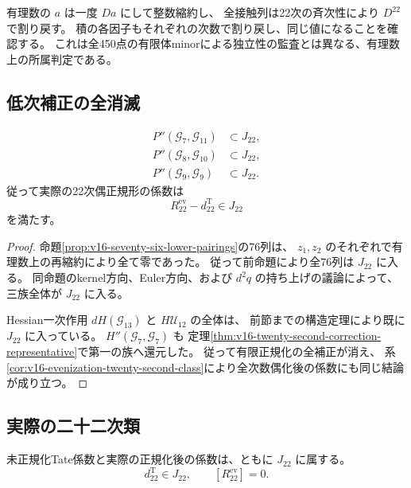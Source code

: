 有理数の $a$ は一度 $Da$ にして整数縮約し、
全接触列は22次の斉次性により $D^{22}$ で割り戻す。
積の各因子もそれぞれの次数で割り戻し、同じ値になることを確認する。
これは全450点の有限体minorによる独立性の監査とは異なる、有理数上の所属判定である。

\subsection{低次補正の全消滅}

\begin{corollary}[二十二次の全低次正規化補正は通常像に入る]
\label{cor:v16-all-lower-corrections-in-image}
\[
 \begin{split}
 P''(\mathcal G_7,\mathcal G_{11})&\subset J_{22},\\
 P''(\mathcal G_8,\mathcal G_{10})&\subset J_{22},\\
 P''(\mathcal G_9,\mathcal G_9)&\subset J_{22}.
 \end{split}
\]
従って実際の22次偶正規形の係数は
\begin{equation}\label{eq:v16-all-corrections-vanish}
 R_{22}^{\mathrm{ev}}-d_{22}^{\mathrm T}\in J_{22}
\end{equation}
を満たす。
\end{corollary}

\begin{proof}
命題\ref{prop:v16-seventy-six-lower-pairings}の76列は、
$z_1,z_2$ のそれぞれで有理数上の再縮約により全て零であった。
従って前命題により全76列は $J_{22}$ に入る。
同命題のkernel方向、Euler方向、および $d^2q$ の持ち上げの議論によって、
三族全体が $J_{22}$ に入る。

Hessian一次作用 $dH(\mathcal G_{13})$ と $H\mathcal U_{12}$ の全体は、
前節までの構造定理により既に $J_{22}$ に入っている。
$H''(\mathcal G_7,\mathcal G_7)$ も
定理\ref{thm:v16-twenty-second-correction-representative}で第一の族へ還元した。
従って有限正規化の全補正が消え、
系\ref{cor:v16-evenization-twenty-second-class}により全次数偶化後の係数にも同じ結論が成り立つ。
\end{proof}

\subsection{実際の二十二次類}

\begin{proposition}[二十二次の実際の境界類の消滅]
\label{prop:v16-actual-twenty-second-class}
未正規化Tate係数と実際の正規化後の係数は、ともに $J_{22}$ に属する。
\[
                d_{22}^{\mathrm T}\in J_{22},\qquad
                [R_{22}^{\mathrm{ev}}]=0.
\]
\end{proposition}


